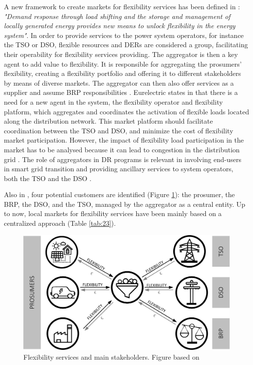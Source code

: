 A new framework to create markets for flexibility services has been defined in \cite{Ulbig2015,USEFFoundation2015a}: \textit{"Demand response through load shifting and the storage and management of locally generated energy provides new means to unlock flexibility in the energy system"}. In order to provide services to the power system operators, for instance the TSO or DSO, flexible resources and DERs are considered a group, facilitating their operability for flexibility services providing. The aggregator is then a key agent to add value to flexibility. It is responsible for aggregating the prosumers' flexibility, creating a flexibility portfolio and offering it to different stakeholders by means of diverse markets. The aggregator can then also offer services as a supplier and assume BRP responsibilities \cite{MarketDesignENTSOE}. Eurelectric states in \cite{mandatova2014flexibility} that there is a need for a new agent in the system, the flexibility operator and flexibility platform, which aggregates and coordinates the activation of flexible loads located along the distribution network. This market platform should facilitate coordination between the TSO and DSO, and minimize the cost of flexibility market participation. However, the impact of flexibility load participation in the market has to be analysed because it can lead to congestion in the distribution grid \cite{esterl2016impact}. The role of aggregators in DR programs is relevant in involving end-users in smart grid transition and providing ancillary services to system operators, both the TSO and the DSO \cite{Carreiro2017}.

Also in \cite{USEFFoundation2015a}, four potential customers are identified (Figure \ref{figure210}): the prosumer, the BRP, the DSO, and the TSO, managed by the aggregator as a central entity. Up to now, local markets for flexibility services have been mainly based on a centralized approach (Table \ref{tab:23}).

\begin{figure}[h]
	\centering
	\includegraphics[width=0.9\columnwidth ]{ChapterIntro/Figures/Figure2.10.jpg}
		\caption{Flexibility services and main stakeholders. Figure based on \cite{USEFFoundation2015a} }  
	\label{figure210}
\end{figure}

